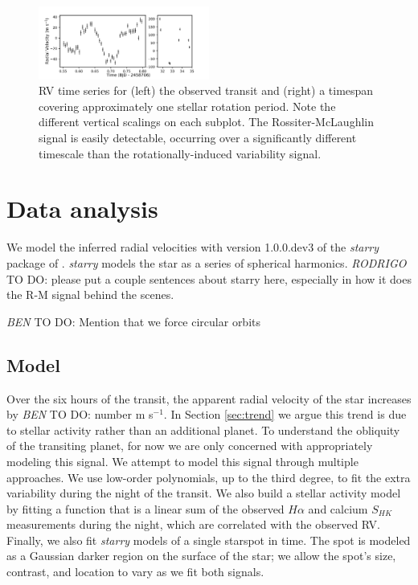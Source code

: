 \documentclass[twocolumn]{aastex63}
\newcommand{\todo}[3]{{\color{#2} \emph{#1} TO DO: #3}}
\newcommand{\btmtodo}[1]{\todo{BEN}{blue}{#1}}
\begin{document}
\begin{figure}[!tbh]
  \begin{center}
    \includegraphics[width=0.5\textwidth, trim={0cm 0.0cm 0cm 0cm}, clip=true]{../figures/all_data.pdf}
   \end{center}
  \caption{RV time series for (left) the observed transit and (right) a timespan covering approximately one stellar rotation period. Note the different vertical scalings on each subplot. The Rossiter-McLaughlin signal is easily detectable, occurring over a significantly different timescale than the rotationally-induced variability signal.}
  \label{fig:data}
\end{figure}



\section{Data analysis}
\label{sec:analysis}

We model the inferred radial velocities with version 1.0.0.dev3 of the \textit{starry} package of \citet{Luger19}. 
\textit{starry} models the star as a series of spherical harmonics. 
\todo{RODRIGO}{red}{please put a couple sentences about starry here, especially in how it does the R-M signal behind the scenes.}

\btmtodo{Mention that we force circular orbits}

\subsection{Model}

Over the six hours of the transit, the apparent radial velocity of the star increases by \btmtodo{number} m s$^{-1}$. 
In Section \ref{sec:trend} we argue this trend is due to stellar activity rather than an additional planet.
To understand the obliquity of the transiting planet, for now we are only concerned with appropriately modeling this signal.
We attempt to model this signal through multiple approaches.
We use low-order polynomials, up to the third degree, to fit the extra variability during the night of the transit. 
We also build a stellar activity model by fitting a function that is a linear sum of the observed $H\alpha$ and calcium $S_{HK}$ measurements during the night, which are correlated with the observed RV.
Finally, we also fit \textit{starry} models of a single starspot in time. The spot is modeled as a Gaussian darker region on the surface of the star; we allow the spot's size, contrast, and location to vary as we fit both signals.
\end{document}
